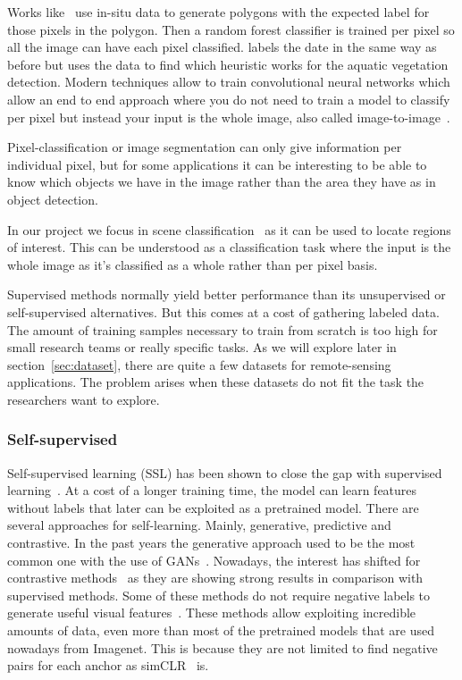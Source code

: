 \documentclass[conference]{IEEEtran}
\begin{document}
    Works like~\citet{rs12244021} use in-situ data to generate polygons with the expected label for those pixels in the polygon.
    Then a random forest classifier is trained per pixel so all the image can have each pixel classified.
    \citet{rs14133013} labels the date in the same way as before but uses the data to find which heuristic works for the aquatic vegetation detection.
    Modern techniques allow to train convolutional neural networks which allow an end to end approach where you do not need to train
    a model to classify per pixel but instead your input is the whole image, also called image-to-image~\cite{rs12244140}.

    Pixel-classification or image segmentation can only give information per individual pixel, but for some applications it can be interesting to be able
    to know which objects we have in the image rather than the area they have as in object detection.

    In our project we focus in scene classification~\cite{9127795} as it can be used to locate regions of interest.
    This can be understood as a classification task where the input is the whole image as it's classified as a whole rather than per pixel
    basis.

    Supervised methods normally yield better performance than its unsupervised or self-supervised alternatives.
    But this comes at a cost of gathering labeled data.
    The amount of training samples necessary to train from scratch is too high for small research teams or really specific tasks.
    As we will explore later in section~\ref{sec:dataset}, there are quite a few datasets for remote-sensing applications.
    The problem arises when these datasets do not fit the task the researchers want to explore.

    \subsubsection{Self-supervised}
    Self-supervised learning (SSL) has been shown to close the gap with supervised learning~\cite{gui2023survey}.
    At a cost of a longer training time, the model can learn features without labels that later can be exploited as a pretrained model.
    There are several approaches for self-learning.
    Mainly, generative, predictive and contrastive.
    In the past years the generative approach used to be the most common one with the use of GANs~\cite{goodfellow2014generative, radford2016unsupervised}.
    Nowadays, the interest has shifted for contrastive methods~\cite{chen2020simple, Jung2021SelfsupervisedLW, caron2021unsupervised} as they are showing strong results in comparison with supervised methods.
    Some of these methods do not require negative labels to generate useful visual features~\cite{DINO, barlowtwins, grill2020bootstrap}.
    These methods allow exploiting incredible amounts of data, even more than most of the pretrained models that are used nowadays from Imagenet.
    This is because they are not limited to find negative pairs for each anchor as simCLR~\cite{chen2020simple} is.
\end{document}
